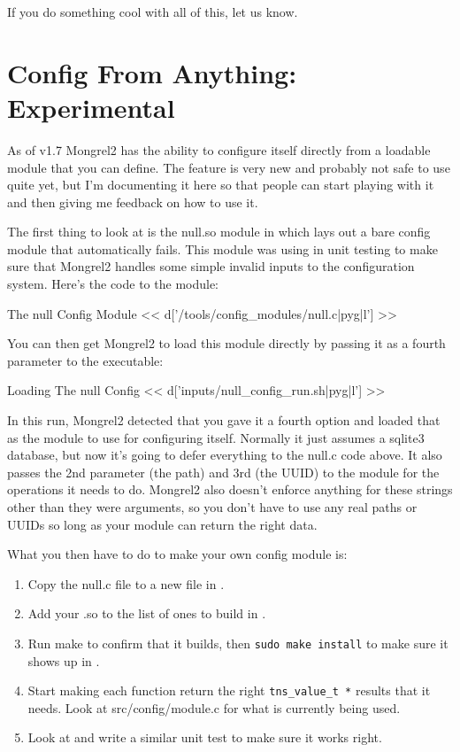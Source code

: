 If you do something cool with all of this, let us know.


\section{Config From Anything: Experimental}

As of v1.7 Mongrel2 has the ability to configure itself directly from a
loadable module that you can define.  The feature is very new and probably
not safe to use quite yet, but I'm documenting it here so that people
can start playing with it and then giving me feedback on how to use it.

The first thing to look at is the null.so module in 
which lays out a bare config module that automatically fails.  This module was
using in unit testing to make sure that Mongrel2 handles some simple invalid
inputs to the configuration system.  Here's the code to the module:

\begin{code}{The null Config Module}
<< d['/tools/config_modules/null.c|pyg|l'] >>
\end{code}

You can then get Mongrel2 to load this module directly by passing it as a
fourth parameter to the  executable:

\begin{code}{Loading The null Config}
<< d['inputs/null_config_run.sh|pyg|l'] >>
\end{code}

In this run, Mongrel2 detected that you gave it a fourth option and 
loaded that as the module to use for configuring itself.  Normally
it just assumes a sqlite3 database, but now it's going to defer
everything to the null.c code above.  It also passes the 2nd parameter
(the path) and 3rd (the UUID) to the module for the operations it
needs to do.  Mongrel2 also doesn't enforce anything for these strings
other than they were arguments, so you don't have to use any real paths
or UUIDs so long as your module can return the right data.

What you then have to do to make your own config module is:

\begin{enumerate}
\item Copy the null.c file to a new file in .
\item Add your .so to the list of ones to build in .
\item Run make to confirm that it builds, then \verb|sudo make install| to make sure it shows up in .
\item Start making each function return the right \verb|tns_value_t *| results that
it needs.  Look at src/config/module.c for what is currently being used.
\item Look at  and write a similar unit test to make sure it works right.
\end{enumerate}

